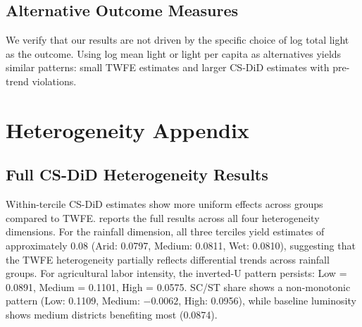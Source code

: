 \documentclass[12pt]{article}
\begin{document}
\subsection{Alternative Outcome Measures}

We verify that our results are not driven by the specific choice of log total light as the outcome. Using log mean light or light per capita as alternatives yields similar patterns: small TWFE estimates and larger CS-DiD estimates with pre-trend violations.


\section{Heterogeneity Appendix}
\label{app:heterogeneity}

\subsection{Full CS-DiD Heterogeneity Results}

Within-tercile CS-DiD estimates show more uniform effects across groups compared to TWFE.  reports the full results across all four heterogeneity dimensions. For the rainfall dimension, all three terciles yield estimates of approximately 0.08 (Arid: 0.0797, Medium: 0.0811, Wet: 0.0810), suggesting that the TWFE heterogeneity partially reflects differential trends across rainfall groups. For agricultural labor intensity, the inverted-U pattern persists: Low = 0.0891, Medium = 0.1101, High = 0.0575. SC/ST share shows a non-monotonic pattern (Low: 0.1109, Medium: $-0.0062$, High: 0.0956), while baseline luminosity shows medium districts benefiting most (0.0874).
\end{document}

